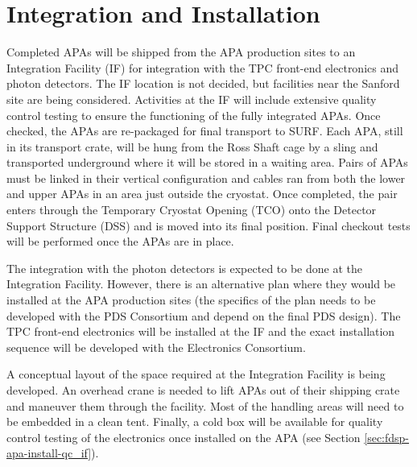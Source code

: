 \section{Integration and Installation} %
\label{sec:fdsp-apa-install}

Completed APAs will be shipped from the APA production sites to an Integration Facility (IF) for integration with the TPC front-end electronics and photon detectors.  The IF location is not decided, but facilities near the Sanford site are being considered.   
Activities at the IF will include extensive quality control testing to ensure the functioning of the fully integrated APAs.  Once checked, the APAs are re-packaged for final transport to SURF. Each APA, still in its transport crate, will be hung from the Ross Shaft cage by a sling and transported underground where it will be stored in a waiting area.  Pairs of APAs must be linked in their vertical configuration and cables ran from both the lower and upper APAs in an area just outside the cryostat.  Once completed, the pair enters through the Temporary Cryostat Opening (TCO) onto the Detector Support Structure (DSS) and is moved into its final position.  Final checkout tests will be performed once the APAs are in place.



The integration with the photon detectors is expected to be done at the Integration Facility. However, there is an alternative plan where they would be installed at the APA production sites (the specifics of the plan needs to be developed with the PDS Consortium and depend on the final PDS design). The TPC front-end electronics will be installed  at the IF and the exact installation sequence will be developed with the Electronics Consortium.

A conceptual layout of the space required at the Integration Facility is being developed. %
An overhead crane is needed to lift APAs out of their shipping crate and maneuver them through the facility.  Most of the handling areas will need to be embedded in a clean tent. Finally, a cold box will be available for quality control testing of the electronics once installed on the APA (see Section \ref{sec:fdsp-apa-install-qc_if}).  %

